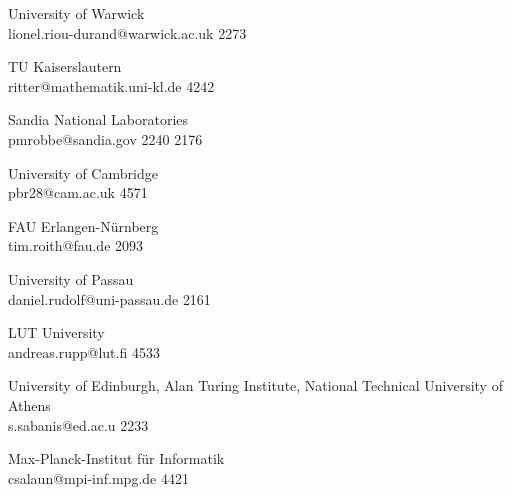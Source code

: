 \begin{multicols}{2}
 {University of Warwick\\}%
 {lionel.riou-durand@warwick.ac.uk}%
 {2273} %
 {} %
 {} %
 {} %
 {} %

 {TU Kaiserslautern\\}%
 {ritter@mathematik.uni-kl.de}%
 {4242} %
 {} %
 {} %
 {} %
 {} %

 {Sandia National Laboratories\\}%
 {pmrobbe@sandia.gov}%
 {2240} %
 {2176} %
 {} %
 {} %
 {} %

 {University of Cambridge\\}%
 {pbr28@cam.ac.uk}%
 {4571} %
 {} %
 {} %
 {} %
 {} %

 {FAU Erlangen-N\"{u}rnberg\\}%
 {tim.roith@fau.de}%
 {2093} %
 {} %
 {} %
 {} %
 {} %

 {University of Passau\\}%
 {daniel.rudolf@uni-passau.de}%
 {2161} %
 {} %
 {} %
 {} %
 {} %

 {LUT University\\}%
 {andreas.rupp@lut.fi}%
 {4533} %
 {} %
 {} %
 {} %
 {} %

 {University of Edinburgh, Alan Turing Institute, National Technical University of Athens\\}%
 {s.sabanis@ed.ac.u}%
 {2233} %
 {} %
 {} %
 {} %
 {} %

 {Max-Planck-Institut f{\"u}r Informatik\\}%
 {csalaun@mpi-inf.mpg.de}%
 {4421} %
 {} %
 {} %
 {} %
 {} %


\end{multicols}
